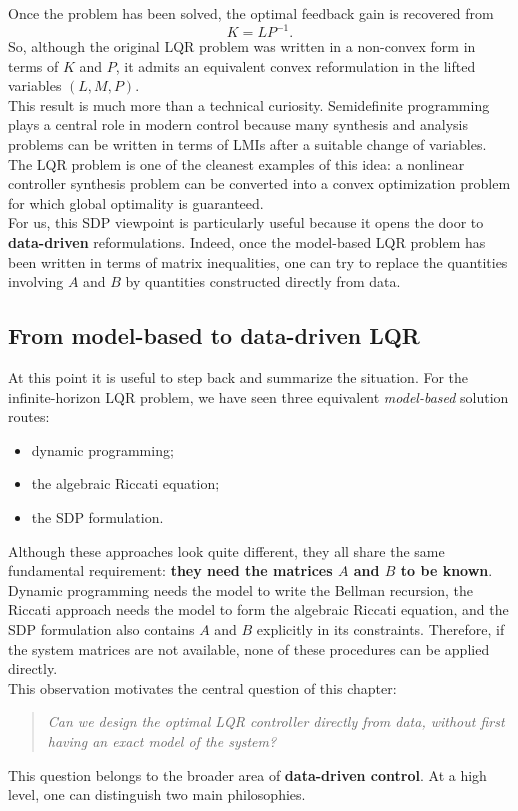 Once the problem has been solved, the optimal feedback gain is recovered from
\[
K = LP^{-1}.
\]
So, although the original LQR problem was written in a non-convex form in terms of $K$ and
$P$, it admits an equivalent convex reformulation in the lifted variables $(L,M,P)$.\\

This result is much more than a technical curiosity. Semidefinite programming plays a central
role in modern control because many synthesis and analysis problems can be written in terms of
LMIs after a suitable change of variables. The LQR problem is one of the cleanest examples of
this idea: a nonlinear controller synthesis problem can be converted into a convex optimization
problem for which global optimality is guaranteed.\\
For us, this SDP viewpoint is particularly useful because it opens the door to \textbf{data-driven}
reformulations. Indeed, once the model-based LQR problem has been written in terms of matrix
inequalities, one can try to replace the quantities involving $A$ and $B$ by quantities constructed
directly from data.

\subsection{From model-based to data-driven LQR}

At this point it is useful to step back and summarize the situation. For the infinite-horizon
LQR problem, we have seen three equivalent \emph{model-based} solution routes:
\begin{itemize}
    \item dynamic programming;
    \item the algebraic Riccati equation;
    \item the SDP formulation.
\end{itemize}
Although these approaches look quite different, they all share the same fundamental
requirement: \textbf{they need the matrices $A$ and $B$ to be known}. Dynamic programming
needs the model to write the Bellman recursion, the Riccati approach needs the model to form
the algebraic Riccati equation, and the SDP formulation also contains $A$ and $B$ explicitly in
its constraints. Therefore, if the system matrices are not available, none of these procedures can
be applied directly.\\
This observation motivates the central question of this chapter:
\begin{quote}
\emph{Can we design the optimal LQR controller directly from data, without first having an
exact model of the system?}
\end{quote}
This question belongs to the broader area of \textbf{data-driven control}. At a high level, one can
distinguish two main philosophies.

